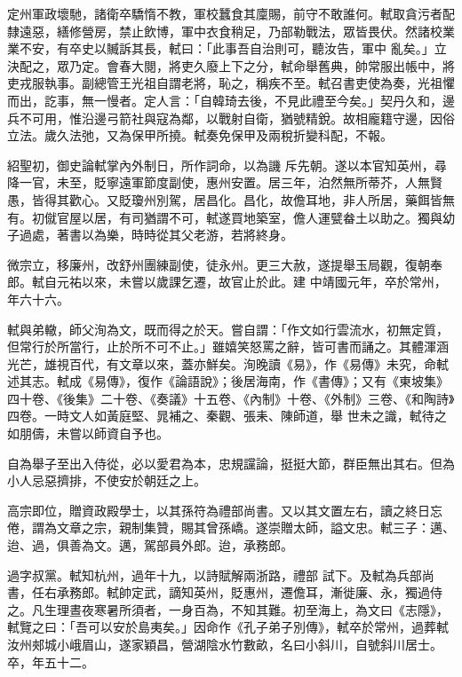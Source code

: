\begin{pinyinscope}
 定州軍政壞馳，諸衛卒驕惰不教，軍校蠶食其廩賜，前守不敢誰何。軾取貪污者配隸遠惡，繕修營房，禁止飲博，軍中衣食稍足，乃部勒戰法，眾皆畏伏。然諸校業業不安，有卒史以贓訴其長，軾曰：「此事吾自治則可，聽汝告，軍中
 亂矣。」立決配之，眾乃定。會春大閱，將吏久廢上下之分，軾命舉舊典，帥常服出帳中，將吏戎服執事。副總管王光祖自謂老將，恥之，稱疾不至。軾召書吏使為奏，光祖懼而出，訖事，無一慢者。定人言：「自韓琦去後，不見此禮至今矣。」契丹久和，邊兵不可用，惟沿邊弓箭社與寇為鄰，以戰射自衛，猶號精銳。故相龐籍守邊，因俗立法。歲久法弛，又為保甲所撓。軾奏免保甲及兩稅折變科配，不報。



 紹聖初，御史論軾掌內外制日，所作詞命，以為譏
 斥先朝。遂以本官知英州，尋降一官，未至，貶寧遠軍節度副使，惠州安置。居三年，泊然無所蒂芥，人無賢愚，皆得其歡心。又貶瓊州別駕，居昌化。昌化，故儋耳地，非人所居，藥餌皆無有。初僦官屋以居，有司猶謂不可，軾遂買地築室，儋人運甓畚土以助之。獨與幼子過處，著書以為樂，時時從其父老游，若將終身。



 微宗立，移廉州，改舒州團練副使，徒永州。更三大赦，遂提舉玉局觀，復朝奉郎。軾自元祐以來，未嘗以歲課乞遷，故官止於此。建
 中靖國元年，卒於常州，年六十六。



 軾與弟轍，師父洵為文，既而得之於天。嘗自謂：「作文如行雲流水，初無定質，但常行於所當行，止於所不可不止。」雖嬉笑怒罵之辭，皆可書而誦之。其體渾涵光芒，雄視百代，有文章以來，蓋亦鮮矣。洵晚讀《易》，作《易傳》未究，命軾述其志。軾成《易傳》，復作《論語說》；後居海南，作《書傳》；又有《東坡集》四十卷、《後集》二十卷、《奏議》十五卷、《內制》十卷、《外制》三卷、《和陶詩》四卷。一時文人如黃庭堅、晁補之、秦觀、張耒、陳師道，舉
 世未之識，軾待之如朋儔，未嘗以師資自予也。



 自為舉子至出入侍從，必以愛君為本，忠規讜論，挺挺大節，群臣無出其右。但為小人忌惡擠排，不使安於朝廷之上。



 高宗即位，贈資政殿學士，以其孫符為禮部尚書。又以其文置左右，讀之終日忘倦，謂為文章之宗，親制集贊，賜其曾孫嶠。遂崇贈太師，謚文忠。軾三子：邁、迨、過，俱善為文。邁，駕部員外郎。迨，承務郎。



 過字叔黨。軾知杭州，過年十九，以詩賦解兩浙路，禮部
 試下。及軾為兵部尚書，任右承務郎。軾帥定武，謫知英州，貶惠州，遷儋耳，漸徙廉、永，獨過侍之。凡生理晝夜寒暑所須者，一身百為，不知其難。初至海上，為文曰《志隱》，軾覽之曰：「吾可以安於島夷矣。」因命作《孔子弟子別傳》，軾卒於常州，過葬軾汝州郟城小峨眉山，遂家穎昌，營湖陰水竹數畝，名曰小斜川，自號斜川居士。卒，年五十二。




\end{pinyinscope}
